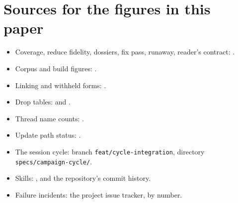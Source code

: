 \documentclass[11pt]{article}
\newcommand{\code}[1]{\texttt{#1}}
\begin{document}
\section{Sources for the figures in this paper}
\label{app:sources}

\begin{itemize}[nosep]
\item Coverage, reduce fidelity, dossiers, fix pass, runaway, reader's contract:
.
\item Corpus and build figures: .
\item Linking and withheld forms:
.
\item Drop tables:  and
.
\item Thread name counts: .
\item Update path status: .
\item The session cycle: branch \code{feat/cycle-integration}, directory
\code{specs/campaign-cycle/}.
\item Skills: , 
and the repository's commit history.
\item Failure incidents: the project issue tracker, by number.
\end{itemize}
\end{document}
